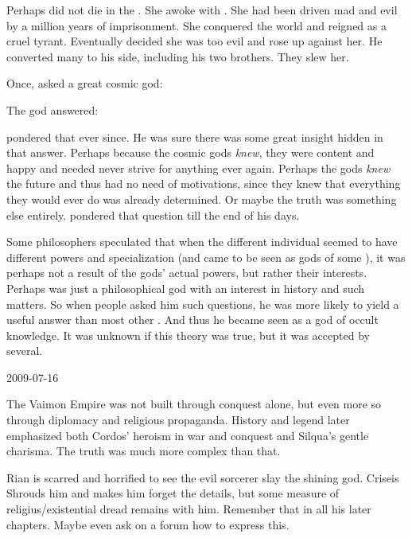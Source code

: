 Perhaps \Tiamat did not die in the \firstbanewar.
She awoke with \Nexagglachel. 
She had been driven mad and evil by a million years of imprisonment.
She conquered the world and reigned as a cruel tyrant.
Eventually \Nexagglachel decided she was too evil and rose up against her.
He converted many \dragons to his side, including his two brothers. 
They slew her. 



Once, \Ishnaruchaefir asked a great cosmic god:

The god answered: 

\Ishnaruchaefir pondered that ever since. 
He was sure there was some great insight hidden in that answer. 
Perhaps because the cosmic gods \emph{knew}, they were content and happy and needed never strive for anything ever again. 
Perhaps the gods \emph{knew} the future and thus had no need of motivations, since they knew that everything they would ever do was already determined. 
Or maybe the truth was something else entirely.
\Ishnaruchaefir pondered that question till the end of his days. 


Some \draconian philosophers speculated that when the different individual \xss seemed to have different powers and specialization (and came to be seen as gods of some ), it was perhaps not a result of the gods' actual powers, but rather their interests.
Perhaps \NerranKoss was just a philosophical god with an interest in history and such matters. 
So when people asked him such questions, he was more likely to yield a useful answer than most other \xss.
And thus he became seen as a god of occult knowledge. 
It was unknown if this theory was true, but it was accepted by several. 



2009-07-16


The Vaimon Empire was not built through conquest alone, but even more so through diplomacy and religious propaganda.
History and legend later emphasized both Cordos' heroism in war and conquest and Silqua's gentle charisma. 
The truth was much more complex than that. 


Rian is scarred and horrified to see the evil sorcerer slay the shining god. 
Criseis Shrouds him and makes him forget the details, but some measure of religius/existential dread remains with him. 
Remember that in all his later chapters.
Maybe even ask on a forum how to express this. 


